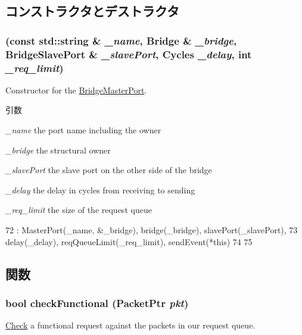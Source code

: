 \subsection{コンストラクタとデストラクタ}
\hypertarget{classBridge_1_1BridgeMasterPort_a0e907bb2314fb9bd4dcc0a702c1948dd}{
\subsubsection[{BridgeMasterPort}]{ (const std::string \& {\em \_\-name}, \/  {\bf Bridge} \& {\em \_\-bridge}, \/  {\bf BridgeSlavePort} \& {\em \_\-slavePort}, \/  {\bf Cycles} {\em \_\-delay}, \/  int {\em \_\-req\_\-limit})}}
\label{classBridge_1_1BridgeMasterPort_a0e907bb2314fb9bd4dcc0a702c1948dd}
Constructor for the \hyperlink{classBridge_1_1BridgeMasterPort}{BridgeMasterPort}.


\begin{DoxyParams}{引数}
\item[{\em \_\-name}]the port name including the owner \item[{\em \_\-bridge}]the structural owner \item[{\em \_\-slavePort}]the slave port on the other side of the bridge \item[{\em \_\-delay}]the delay in cycles from receiving to sending \item[{\em \_\-req\_\-limit}]the size of the request queue \end{DoxyParams}



\begin{DoxyCode}
72     : MasterPort(_name, &_bridge), bridge(_bridge), slavePort(_slavePort),
73       delay(_delay), reqQueueLimit(_req_limit), sendEvent(*this)
74 {
75 }
\end{DoxyCode}


\subsection{関数}
\hypertarget{classBridge_1_1BridgeMasterPort_a8eb60d4744b6212ad749f3a586759266}{
\subsubsection[{checkFunctional}]{\setlength{\rightskip}{0pt plus 5cm}bool checkFunctional ({\bf PacketPtr} {\em pkt})}}
\label{classBridge_1_1BridgeMasterPort_a8eb60d4744b6212ad749f3a586759266}
\hyperlink{classCheck}{Check} a functional request against the packets in our request queue.


